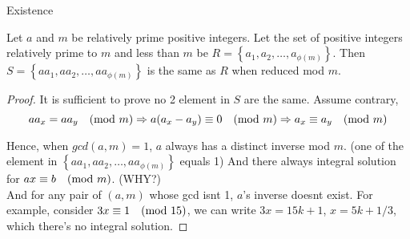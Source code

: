 \begin{mysubsection}{Existence}
    \begin{theorem}[thm:]{}
        Let $a$ and $m$ be relatively prime positive integers. Let the set of positive integers relatively prime to $m$ and less than $m$ be $R=\left\{a_1,a_2,\dots,a_{\phi (m)}\right\}$. Then $S=\left\{aa_1,aa_2,\dots,aa_{\phi (m)}\right\}$ is the same as $R$ when reduced mod $m$.
    \end{theorem}

    \begin{proof}
        It is sufficient to prove no 2 element in $S$ are the same. Assume contrary,
        \begin{equation*}
            aa_x=aa_y\quad (\textnormal{mod }m)\Rightarrow a(a_x-a_y)\equiv 0\quad (\textnormal{mod }m)\Rightarrow a_x\equiv a_y\quad (\textnormal{mod }m)
        \end{equation*}

        Hence, when $gcd(a,m)=1$, $a$ always has a distinct inverse mod $m$. (one of the element in $\left\{aa_1,aa_2,\dots,aa_{\phi (m)}\right\}$ equals 1) And there always integral solution for $ax\equiv b\quad (\textnormal{mod }m)$. (WHY?)\\

        And for any pair of $(a,m)$ whose gcd isnt 1, $a$'s inverse doesnt exist. For example, consider $3x\equiv 1\quad (\textnormal{mod }15)$, we can write $3x=15k+1$, $x=5k+1/3$, which there's no integral solution.
    \end{proof}
\end{mysubsection}
